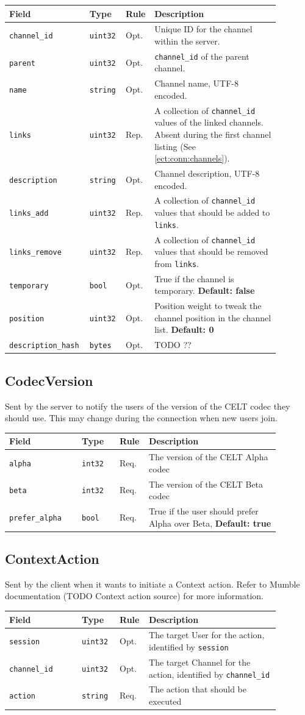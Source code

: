 \documentclass[11pt]{article} %
\newenvironment{mumbleMessageEx}
{%
	\small
	\renewcommand\arraystretch{1.5}
	\begin{tabular}{p{0.25\linewidth}p{0.13\linewidth}p{0.05\linewidth}p{0.45\linewidth}}
	Field & Type & Rule & Description \\
	\hline
}
{%
	\end{tabular}
	\renewcommand\arraystretch{1.0}
}
\newcommand{\mumbleMessageExItem}[4]{ \texttt{#1} & \texttt{#2} & #3 & #4 \\ }
\begin{document}
\begin{mumbleMessageEx}
\mumbleMessageExItem{channel\_id}{uint32}{Opt.}{Unique ID for the channel within the server.}
\mumbleMessageExItem{parent}{uint32}{Opt.}{\texttt{channel\_id} of the parent channel.}
\mumbleMessageExItem{name}{string}{Opt.}{Channel name, UTF-8 encoded.}
\mumbleMessageExItem{links}{uint32}{Rep.}{A collection of \texttt{channel\_id} values of the linked channels. Absent during the first channel listing (See \ref{ect:conn:channels}).}
\mumbleMessageExItem{description}{string}{Opt.}{Channel description, UTF-8 encoded.}
\mumbleMessageExItem{links\_add}{uint32}{Rep.}{A collection of \texttt{channel\_id} values that should be added to \texttt{links}.}
\mumbleMessageExItem{links\_remove}{uint32}{Rep.}{A collection of \texttt{channel\_id} values that should be removed from \texttt{links}.}
\mumbleMessageExItem{temporary}{bool}{Opt.}{True if the channel is temporary. \textbf{Default: false}}
\mumbleMessageExItem{position}{uint32}{Opt.}{Position weight to tweak the channel position in the channel list. \textbf{Default: 0}}
\mumbleMessageExItem{description\_hash}{bytes}{Opt.}{TODO ??}
\end{mumbleMessageEx}

\subsection{CodecVersion}
\label{msg:codecVersion}

Sent by the server to notify the users of the version of the CELT codec they should use. This may change during the connection when new users join.

\begin{mumbleMessageEx}
\mumbleMessageExItem{alpha}{int32}{Req.}{The version of the CELT Alpha codec}
\mumbleMessageExItem{beta}{int32}{Req.}{The version of the CELT Beta codec}
\mumbleMessageExItem{prefer\_alpha}{bool}{Req.}{True if the user should prefer Alpha over Beta, \textbf{Default: true}}
\end{mumbleMessageEx}

\subsection{ContextAction}
\label{msg:contextAction}

Sent by the client when it wants to initiate a Context action. Refer to Mumble documentation (TODO Context action source) for more information.

\begin{mumbleMessageEx}
\mumbleMessageExItem{session}{uint32}{Opt.}{The target User for the action, identified by \texttt{session}}
\mumbleMessageExItem{channel\_id}{uint32}{Opt.}{The target Channel for the action, identified by \texttt{channel\_id}}
\mumbleMessageExItem{action}{string}{Req.}{The action that should be executed}
\end{mumbleMessageEx}
\end{document}
